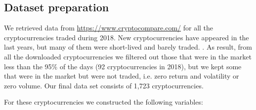 \documentclass{bmcart}
\begin{document}
\subsection*{Dataset preparation}
We retrieved data from \url{https://www.cryptocompare.com/} for all the cryptocurrencies traded during 2018. New cryptocurrencies have appeared in the last years, but many of them were short-lived and barely traded. . As  result, from all the downloaded cryptocurrencies we filtered out those that were in the market less than the 95\% of the days (92 cryptocurrencies in 2018), but we kept some that were in the market but were not traded, i.e. zero return and volatility or zero volume. Our final data set consists of 1,723 cryptocurrencies. 

For these cryptocurrencies we constructed the following variables:
\end{document}
